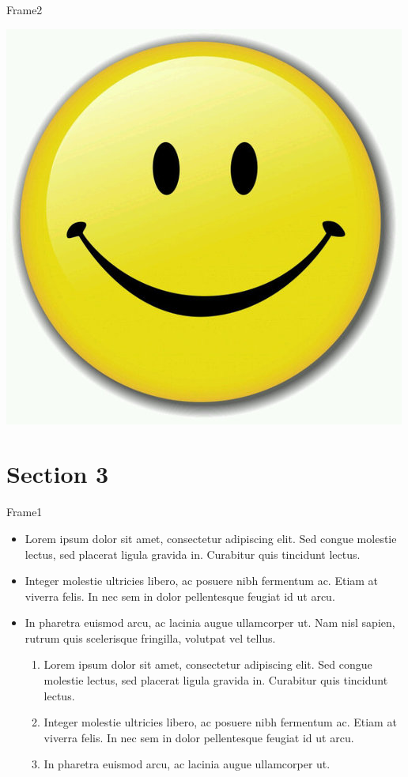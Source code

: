 \documentclass[notes, red, mathserif]{beamer}
\newcounter{saveenumi}
\newcommand{\seti}{\setcounter{saveenumi}{\value{enumi}}}
\begin{document}
\begin{frame}{Frame2}

	\includegraphics[width =  \columnwidth]{image.jpg}


\end{frame}

\section{Section 3}

\begin{frame}{Frame1}
	\begin{itemize}[<+->]
		\item Lorem ipsum dolor sit amet, consectetur adipiscing elit. Sed congue molestie lectus, sed placerat ligula gravida in. Curabitur quis tincidunt lectus.
		\item Integer molestie ultricies libero, ac posuere nibh fermentum ac. Etiam at viverra felis. In nec sem in dolor pellentesque feugiat id ut arcu.
		\item In pharetra euismod arcu, ac lacinia augue ullamcorper ut. Nam nisl sapien, rutrum quis scelerisque fringilla, volutpat vel tellus.
		\begin{enumerate}[<+->]
			\item Lorem ipsum dolor sit amet, consectetur adipiscing elit. Sed congue molestie lectus, sed placerat ligula gravida in. Curabitur quis tincidunt lectus.
			\item Integer molestie ultricies libero, ac posuere nibh fermentum ac. Etiam at viverra felis. In nec sem in dolor pellentesque feugiat id ut arcu.
			\item In pharetra euismod arcu, ac lacinia augue ullamcorper ut.
		\end{enumerate}
	\end{itemize}
	\seti

\end{frame}
\end{document}
